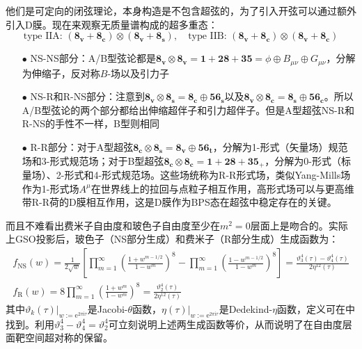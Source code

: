 他们是可定向的闭弦理论，本身构造是不包含超弦的，为了引入开弦可以通过额外引入D膜。现在来观察无质量谱构成的超多重态：
\begin{equation}
	\text{type IIA: }(\mathbf{8_v}+\mathbf{8_c})\otimes(\mathbf{8_v}+\mathbf{8_s}),\quad \text{type IIB: }(\mathbf{8_v}+\mathbf{8_c})\otimes(\mathbf{8_v}+\mathbf{8_c})
\end{equation}
\begin{itemize}
	\item[$\bullet$]NS-NS部分：A/B型弦论都是$\mathbf{8_v}\otimes\mathbf{8_v}=\mathbf{1}+\mathbf{28}+\mathbf{35}=\phi\oplus B_{\mu\nu}\oplus G_{\mu\nu}$，分解为伸缩子，反对称$B$-场以及引力子
	\item[$\bullet$]NS-R和R-NS部分：注意到$\mathbf{8_v}\otimes\mathbf{8_s}=\mathbf{8_c}\oplus\mathbf{56_s}$以及$\mathbf{8_v}\otimes\mathbf{8_c}=\mathbf{8_s}\oplus\mathbf{56_c}$。所以A/B型弦论的两个部分都给出伸缩超伴子和引力超伴子。但是A型超弦NS-R和R-NS的手性不一样，B型则相同
	\item[$\bullet$]R-R部分：对于A型超弦$\mathbf{8_c}\otimes\mathbf{8_s}=\mathbf{8_v}\oplus\mathbf{56_t}$，分解为1-形式（矢量场）规范场和3-形式规范场；对于B型超弦$\mathbf{8_c}\otimes\mathbf{8_c}=\mathbf{1}+\mathbf{2}\mathbf{8}+\mathbf{3}\mathbf{5_+}$，分解为0-形式（标量场）、2-形式和4-形式规范场。这些场统称为R-R形式场，类似Yang-Mills场作为1-形式场$A^\mu$在世界线上的拉回与点粒子相互作用，高形式场可以与更高维带R-R荷的D膜相互作用，这是D膜作为BPS态在超弦中稳定存在的关键。
\end{itemize}
而且不难看出费米子自由度和玻色子自由度至少在$m^2=0$层面上是吻合的。实际上GSO投影后，玻色子（NS部分生成）和费米子（R部分生成）生成函数为：
\begin{equation}
	\begin{gathered}
		f_{\mathrm{NS}}(w)=\frac{1}{2\sqrt{w}}\left[\prod_{m=1}^{\infty}\left(\frac{1+w^{m-1/2}}{1-w^m}\right)^8-\prod_{m=1}^{\infty}\left(\frac{1-w^{m-1/2}}{1-w^m}\right)^8\right]=\frac{\vartheta_3^4(\tau)-\vartheta_4^4(\tau)}{2\eta^{12}(\tau)}\\
	f_{\mathrm{R}}(w)=8\prod_{m=1}^\infty\left(\frac{1+w^m}{1-w^m}\right)^8=\frac{\vartheta_2^4(\tau)}{2\eta^{12}(\tau)}
	\end{gathered}
\end{equation}
其中$\vartheta_k(\tau)|_{w:=\mathrm{e}^{2\pi\mathrm{i}\tau}}$是Jacobi-$\theta$函数，$\eta(\tau)|_{w:=\mathrm{e}^{2\pi\mathrm{i}\tau}}$是Dedekind-$\eta$函数，定义可在\cite{Blumenhagen:2013fgp}中找到。利用$\vartheta^4_3-\vartheta^4_4=\vartheta^4_2$\cite{wzx}可立刻说明上述两生成函数等价，从而说明了在自由度层面靶空间超对称的保留。

